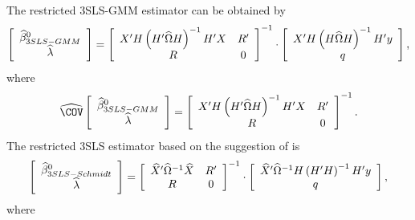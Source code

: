 The restricted 3SLS-GMM estimator can be obtained by
\begin{equation}
   \left[ \begin{array}{c}
      \widehat{\beta}^0_{3SLS-GMM} \\ \widehat{\lambda}
   \end{array} \right]
   =
   \left[ \begin{array}{cc}
      X' H \left( H' \widehat{\Omega} H \right)^{-1} H' X & R' \\
      R & 0
   \end{array} \right]^{-1}
   \cdot
   \left[ \begin{array}{c}
      X' H \left( H \widehat{\Omega} H \right)^{-1} H' y \\ q
   \end{array} \right] ,
   \label{eq:3slsGmmR}
\end{equation}
where
\begin{equation}
   \COVHat
   \left[ \begin{array}{c}
      \widehat{\beta}^0_{3SLS-GMM} \\ \widehat{\lambda}
   \end{array} \right] 
   = 
   \left[ \begin{array}{cc}
      X' H \left( H' \OHat H \right)^{-1} H' X & R' \\
      R & 0
   \end{array} \right]^{-1} .
\end{equation}
The restricted 3SLS estimator based on the suggestion of
\cite{schmidt90} is
\begin{equation}
   \left[ \begin{array}{c}
      \widehat{\beta}^0_{3SLS-Schmidt} \\ \widehat{\lambda}
   \end{array} \right]
   =
   \left[ \begin{array}{cc}
      \widehat{X}' \widehat{\Omega}^{-1} \widehat{X} & R' \\
      R & 0
   \end{array} \right]^{-1}
   \cdot
   \left[ \begin{array}{c}
      \widehat{X}' \widehat{\Omega}^{-1} H \left( H' H \right)^{-1} H' y \\ q
   \end{array} \right] ,
   \label{eq:3slsSchmidtR}
\end{equation}
where

